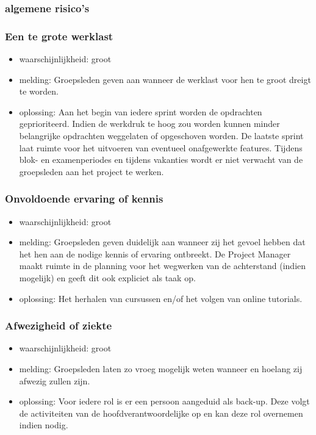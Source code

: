 
\subsubsection{algemene risico's}

\subsubsection*{Een te grote werklast}
\begin{itemize}
\item waarschijnlijkheid: groot
\item melding: Groepsleden geven aan wanneer de werklast voor hen te groot dreigt te worden.
\item oplossing: Aan het begin van iedere sprint worden de opdrachten geprioriteerd. Indien de werkdruk te hoog zou worden kunnen minder belangrijke opdrachten weggelaten of opgeschoven worden. De laatste sprint laat ruimte voor het uitvoeren van eventueel onafgewerkte features. Tijdens blok- en examenperiodes en tijdens vakanties wordt er niet verwacht van de groepsleden aan het project te werken.
\end{itemize}

\subsubsection*{Onvoldoende ervaring of kennis}
\begin{itemize}
\item waarschijnlijkheid: groot
\item melding: Groepsleden geven duidelijk aan wanneer zij het gevoel hebben dat het hen aan de nodige kennis of ervaring ontbreekt. De Project Manager maakt ruimte in de planning voor het wegwerken van de achterstand (indien mogelijk) en geeft dit ook expliciet als taak op.
\item oplossing: Het herhalen van cursussen en/of het volgen van online tutorials.
\end{itemize}

\subsubsection*{Afwezigheid of ziekte}
\begin{itemize}
\item waarschijnlijkheid: groot
\item melding: Groepsleden laten zo vroeg mogelijk weten wanneer en hoelang zij afwezig zullen zijn.
\item oplossing: Voor iedere rol is er een persoon aangeduid als back-up. Deze volgt de activiteiten van de hoofdverantwoordelijke op en kan deze rol overnemen indien nodig.
\end{itemize}

